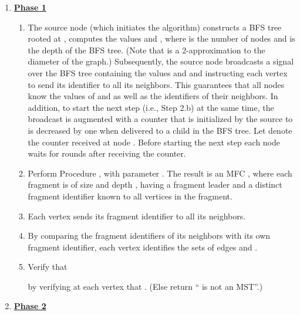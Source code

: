 \documentclass[11pt,letter]{article}
\begin{document}
\begin{enumerate}
\item
{\bf\underline{Phase 1}}

\begin{enumerate}
\item \label{send_ids} The source node  (which initiates the algorithm) constructs a BFS tree rooted at , computes the values  and , where  is the number of nodes and  is the depth of the BFS tree. (Note that  is a 2-approximation to the diameter  of the graph.) Subsequently, the source node  broadcasts a signal over the BFS tree containing the values  and  and instructing each vertex to send its identifier to all its neighbors. 
This guarantees that all nodes know the values of  and  as well as the identifiers of their neighbors. 
In addition, to start the next step (i.e., Step 2.b) at the same time, the broadcast is augmented with a counter that is initialized by the source   to  is decreased by one when delivered to a child in the BFS tree. Let  denote the counter received at node . Before starting the next step each node  waits for  rounds after receiving the counter.

\item \label{dom} 
Perform  Procedure , with parameter . 
The result is an MFC , where each fragment 
 is of size  
and depth , having a fragment leader and a distinct fragment identifier 
known to all vertices in the fragment.
\item \label{send_fragment} 
Each vertex sends its fragment identifier to all its neighbors.
\item  \label{identify_int_vs_ext_edges}
By comparing the fragment identifiers of its neighbors with its own fragment identifier, each vertex  identifies the sets of  edges   and .
\item \label{verify_internal_edges}
Verify that 
 
by verifying at each vertex  that .
(Else return `` is not an MST''.)
\end{enumerate}

\item 
{\bf \underline{Phase 2}}
\begin{enumerate}


\end{enumerate}
\end{enumerate}
\end{document}
